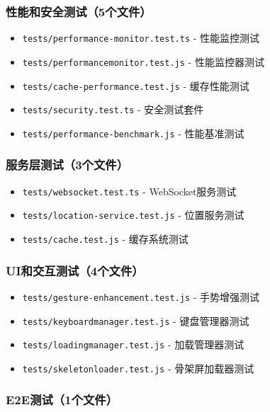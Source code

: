 \documentclass[12pt,a4paper,openany]{report}
\begin{document}
\subsubsection{性能和安全测试（5个文件）}

\begin{itemize}
    \item \texttt{tests/performance-monitor.test.ts} - 性能监控测试
    \item \texttt{tests/performancemonitor.test.js} - 性能监控器测试
    \item \texttt{tests/cache-performance.test.js} - 缓存性能测试
    \item \texttt{tests/security.test.ts} - 安全测试套件
    \item \texttt{tests/performance-benchmark.js} - 性能基准测试
\end{itemize}

\subsubsection{服务层测试（3个文件）}

\begin{itemize}
    \item \texttt{tests/websocket.test.ts} - WebSocket服务测试
    \item \texttt{tests/location-service.test.js} - 位置服务测试
    \item \texttt{tests/cache.test.js} - 缓存系统测试
\end{itemize}

\subsubsection{UI和交互测试（4个文件）}

\begin{itemize}
    \item \texttt{tests/gesture-enhancement.test.js} - 手势增强测试
    \item \texttt{tests/keyboardmanager.test.js} - 键盘管理器测试
    \item \texttt{tests/loadingmanager.test.js} - 加载管理器测试
    \item \texttt{tests/skeletonloader.test.js} - 骨架屏加载器测试
\end{itemize}

\subsubsection{E2E测试（1个文件）}
\end{document}
